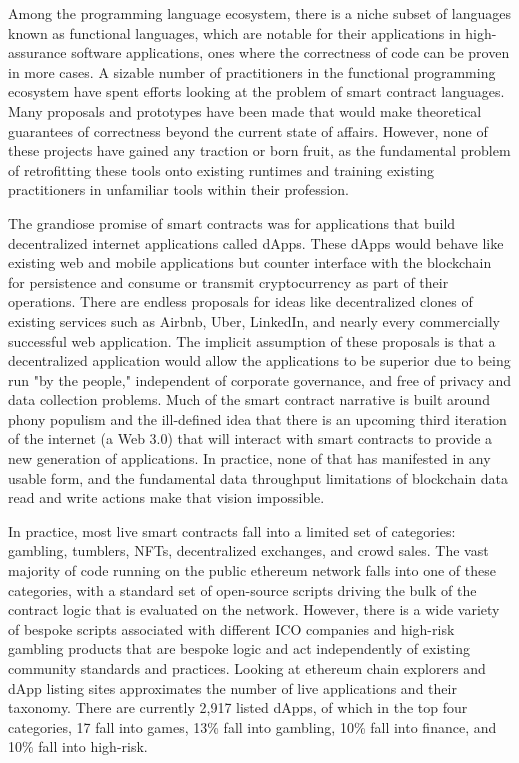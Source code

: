 Among the programming language ecosystem, there is a niche subset of languages
known as functional languages, which are notable for their applications in
high-assurance software applications, ones where the correctness of code can be
proven in more cases. A sizable number of practitioners in the functional
programming ecosystem have spent efforts looking at the problem of smart
contract languages. Many proposals and prototypes have been made that would make
theoretical guarantees of correctness beyond the current state of affairs.
However, none of these projects have gained any traction or born fruit, as the
fundamental problem of retrofitting these tools onto existing runtimes and
training existing practitioners in unfamiliar tools within their profession.

The grandiose promise of smart contracts was for applications that build
decentralized internet applications called dApps. These dApps would behave like
existing web and mobile applications but counter interface with the blockchain
for persistence and consume or transmit cryptocurrency as part of their
operations. There are endless proposals for ideas like decentralized clones of
existing services such as Airbnb, Uber, LinkedIn, and nearly every commercially
successful web application. The implicit assumption of these proposals is that a
decentralized application would allow the applications to be superior due to
being run "by the people," independent of corporate governance, and free of
privacy and data collection problems. Much of the smart contract narrative is
built around phony populism and the ill-defined idea that there is an upcoming
third iteration of the internet (a Web 3.0) that will interact with smart
contracts to provide a new generation of applications. In practice, none of that
has manifested in any usable form, and the fundamental data throughput
limitations of blockchain data read and write actions make that vision
impossible.

In practice, most live smart contracts fall into a limited set of categories:
gambling, tumblers, NFTs, decentralized exchanges, and crowd sales. The vast
majority of code running on the public ethereum network falls into one of these
categories, with a standard set of open-source scripts driving the bulk of the
contract logic that is evaluated on the network. However, there is a wide
variety of bespoke scripts associated with different ICO companies and high-risk
gambling products that are bespoke logic and act independently of existing
community standards and practices. Looking at ethereum chain explorers and dApp
listing sites approximates the number of live applications and their taxonomy.
There are currently 2,917 listed dApps, of which in the top four categories, 17%
fall into games, 13\% fall into gambling, 10\% fall into finance, and 10\% fall
into high-risk.

